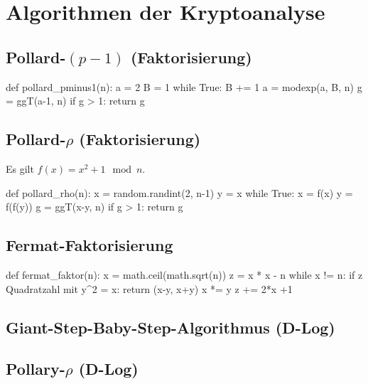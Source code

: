 \chapter{Algorithmen der Kryptoanalyse}
\section{Pollard-$(p-1)$ (Faktorisierung)}
\begin{python}
def pollard_pminus1(n):
    a = 2
    B = 1
    while True:
        B += 1
        a = modexp(a, B, n)
        g = ggT(a-1, n)
        if g > 1:
            return g
\end{python}

\section{Pollard-$\rho$ (Faktorisierung)}
Es gilt $f(x) = x^2 + 1 \mod n$.
\begin{python}
def pollard_rho(n):
    x = random.randint(2, n-1)
    y = x
    while True:
        x = f(x)
        y = f(f(y))
        g = ggT(x-y, n)
        if g > 1:
            return g
\end{python}

\section{Fermat-Faktorisierung}
\begin{python}
def fermat_faktor(n):
    x = math.ceil(math.sqrt(n))
    z = x * x - n
    while x != n:
        if z Quadratzahl mit y^2 = x:
            return (x-y, x+y)
        x *= y
        z += 2*x +1
\end{python}

\section{Giant-Step-Baby-Step-Algorithmus (D-Log)}

\section{Pollary-$\rho$ (D-Log)}
